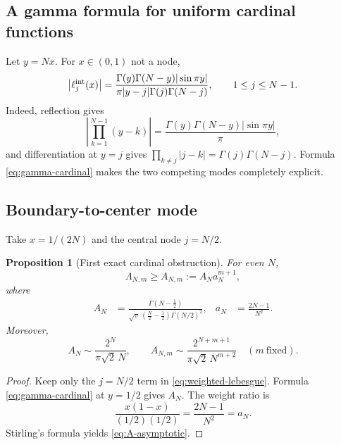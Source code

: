 \documentclass[11pt,oneside]{article}
\numberwithin{equation}{section}
\newtheorem{proposition}[theorem]{Proposition}
\theoremstyle{definition}
\theoremstyle{remark}
\newcommand{\Leb}{\Lambda}
\begin{document}
\subsection{A gamma formula for uniform cardinal functions}

Let $y=Nx$.  For $x\in(0,1)$ not a node,
\begin{equation}
 \left|\ell_j^{\rm int}(x)\right|
 =\frac{\Gamma(y)\Gamma(N-y)|\sin\pi y|}
 {\pi|y-j|\Gamma(j)\Gamma(N-j)},
 \qquad 1\le j\le N-1.
 \label{eq:gamma-cardinal}
\end{equation}
Indeed, reflection gives
\begin{equation}
 \left|\prod_{k=1}^{N-1}(y-k)\right|
 =\frac{\Gamma(y)\Gamma(N-y)|\sin\pi y|}{\pi},
\end{equation}
and differentiation at $y=j$ gives
$\prod_{k\ne j}|j-k|=\Gamma(j)\Gamma(N-j)$.
Formula \eqref{eq:gamma-cardinal} makes the two competing modes completely explicit.

\subsection{Boundary-to-center mode}

Take $x=1/(2N)$ and the central node $j=N/2$.

\begin{proposition}[First exact cardinal obstruction]
\label{prop:A-mode}
For even $N$,
\begin{equation}
 \Leb_{N,m}\ge A_{N,m}:=A_Na_N^{m+1},
 \label{eq:A-mode}
\end{equation}
where
\begin{align}
 A_N&=
 \frac{\Gamma(N-\tfrac12)}
 {\sqrt\pi\,(\tfrac N2-\tfrac12)\Gamma(N/2)^2},
 &a_N&=\frac{2N-1}{N^2}.
 \label{eq:A-components}
\end{align}
Moreover,
\begin{equation}
 A_N\sim \frac{2^N}{\pi\sqrt2\,N},
 \qquad
 A_{N,m}\sim
 \frac{2^{N+m+1}}{\pi\sqrt2\,N^{m+2}}
 \quad(m\ \text{fixed}).
 \label{eq:A-asymptotic}
\end{equation}
\end{proposition}

\begin{proof}
Keep only the $j=N/2$ term in \eqref{eq:weighted-lebesgue}.  Formula
\eqref{eq:gamma-cardinal} at $y=1/2$ gives $A_N$.  The weight ratio is
\[
 \frac{x(1-x)}{(1/2)(1/2)}=\frac{2N-1}{N^2}=a_N.
\]
Stirling's formula yields \eqref{eq:A-asymptotic}.
\end{proof}
\end{document}
